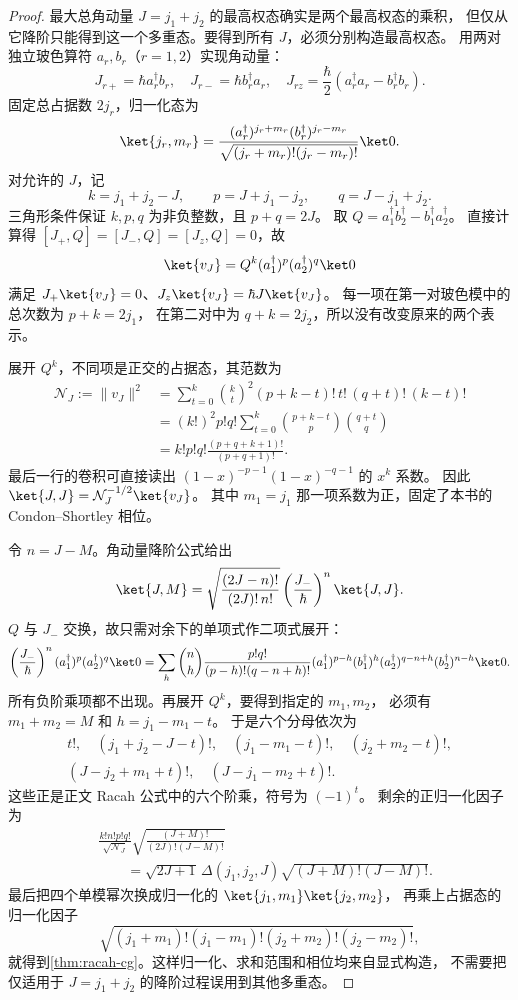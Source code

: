\begin{proof}
最大总角动量 $J=j_1+j_2$ 的最高权态确实是两个最高权态的乘积，
但仅从它降阶只能得到这一个多重态。要得到所有 $J$，必须分别构造最高权态。
用两对独立玻色算符 $a_r,b_r$（$r=1,2$）实现角动量：
\[
J_{r+}=\hbar a_r^\dagger b_r,\quad
J_{r-}=\hbar b_r^\dagger a_r,\quad
J_{rz}=\frac\hbar2(a_r^\dagger a_r-b_r^\dagger b_r).
\]
固定总占据数 $2j_r$，归一化态为
\[
\ket{j_r,m_r}
=\frac{(a_r^\dagger)^{j_r+m_r}(b_r^\dagger)^{j_r-m_r}}
{\sqrt{(j_r+m_r)!(j_r-m_r)!}}\ket0.
\]
对允许的 $J$，记
\[
k=j_1+j_2-J,\qquad p=J+j_1-j_2,\qquad q=J-j_1+j_2.
\]
三角形条件保证 $k,p,q$ 为非负整数，且 $p+q=2J$。
取 $Q=a_1^\dagger b_2^\dagger-b_1^\dagger a_2^\dagger$。
直接计算得 $[J_+,Q]=[J_-,Q]=[J_z,Q]=0$，故
\[
\ket{v_J}=Q^k(a_1^\dagger)^p(a_2^\dagger)^q\ket0
\]
满足 $J_+\ket{v_J}=0$、$J_z\ket{v_J}=\hbar J\ket{v_J}$。
每一项在第一对玻色模中的总次数为 $p+k=2j_1$，
在第二对中为 $q+k=2j_2$，所以没有改变原来的两个表示。

展开 $Q^k$，不同项是正交的占据态，其范数为
\begin{align*}
\mathcal N_J:=\|v_J\|^2
&=\sum_{t=0}^k\binom kt^2(p+k-t)!\,t!\,(q+t)!\,(k-t)!\\
&=(k!)^2p!q!\sum_{t=0}^k
\binom{p+k-t}{p}\binom{q+t}{q}\\
&=k!p!q!\frac{(p+q+k+1)!}{(p+q+1)!}.
\end{align*}
最后一行的卷积可直接读出 $(1-x)^{-p-1}(1-x)^{-q-1}$ 的 $x^k$ 系数。
因此 $\ket{J,J}=\mathcal N_J^{-1/2}\ket{v_J}$。
其中 $m_1=j_1$ 那一项系数为正，固定了本书的 Condon--Shortley 相位。

令 $n=J-M$。角动量降阶公式给出
\[
\ket{J,M}
=\sqrt{\frac{(2J-n)!}{(2J)!\,n!}}
\left(\frac{J_-}{\hbar}\right)^n\ket{J,J}.
\]
$Q$ 与 $J_-$ 交换，故只需对余下的单项式作二项式展开：
\[
\left(\frac{J_-}{\hbar}\right)^n
(a_1^\dagger)^p(a_2^\dagger)^q\ket0
=\sum_h\binom nh\frac{p!q!}{(p-h)!(q-n+h)!}
(a_1^\dagger)^{p-h}(b_1^\dagger)^h
(a_2^\dagger)^{q-n+h}(b_2^\dagger)^{n-h}\ket0.
\]
所有负阶乘项都不出现。再展开 $Q^k$，要得到指定的 $m_1,m_2$，
必须有 $m_1+m_2=M$ 和 $h=j_1-m_1-t$。
于是六个分母依次为
\[
\begin{gathered}
t!,\quad (j_1+j_2-J-t)!,\quad(j_1-m_1-t)!,\quad(j_2+m_2-t)!,\\
(J-j_2+m_1+t)!,\quad(J-j_1-m_2+t)!.
\end{gathered}
\]
这些正是正文 Racah 公式中的六个阶乘，符号为 $(-1)^t$。
剩余的正归一化因子为
\[
\begin{aligned}
&\frac{k!n!p!q!}{\sqrt{\mathcal N_J}}
\sqrt{\frac{(J+M)!}{(2J)!(J-M)!}}\\
&\qquad=\sqrt{2J+1}\,\Delta(j_1,j_2,J)
\sqrt{(J+M)!(J-M)!}.
\end{aligned}
\]
最后把四个单模幂次换成归一化的 $\ket{j_1,m_1}\ket{j_2,m_2}$，
再乘上占据态的归一化因子
\[
\sqrt{(j_1+m_1)!(j_1-m_1)!(j_2+m_2)!(j_2-m_2)!},
\]
就得到\cref{thm:racah-cg}。这样归一化、求和范围和相位均来自显式构造，
不需要把仅适用于 $J=j_1+j_2$ 的降阶过程误用到其他多重态。
\end{proof}

